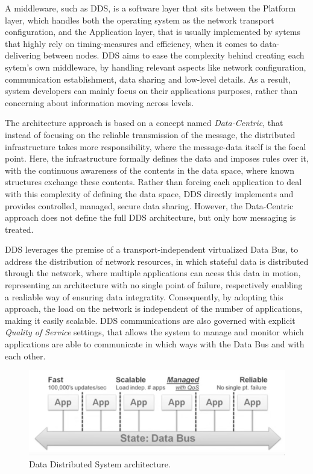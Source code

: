 A middleware, such as DDS, is a software layer that sits between the Platform layer, which handles both the operating system as the network transport configuration, and the Application layer, that is usually implemented by sytems that highly rely on timing-measures and efficiency, when it comes to data-delivering between nodes. DDS aims to ease the complexity behind creating each sytem's own middleware, by handling relevant aspects like network configuration, communication establishment, data sharing and low-level details. As a result, system developers can mainly focus on their applications purposes, rather than concerning about information moving across levels. 

The architecture approach is based on a concept named \textit{Data-Centric}, that instead of focusing on the reliable transmission of the message, the distributed infrastructure takes more responsibility, where the message-data itself is the focal point. Here, the infrastructure formally defines the data and imposes rules over it, with the continuous awareness of the contents in the data space, where known structures exchange these contents. Rather than forcing each application to deal with this complexity of defining the data space, DDS directly implements and provides controlled, managed, secure data sharing. However, the Data-Centric approach does not define the full DDS architecture, but only how messaging is treated.

DDS leverages the premise of a transport-independent virtualized Data Bus, to address the distribution of network resources, in which stateful data is distributed through the network, where multiple applications can acess this data in motion, representing an architecture with no single point of failure, respectively enabling a realiable way of ensuring data integratity. Consequently, by adopting this approach, the load on the network is independent of the number of applications, making it easily scalable. DDS communications are also governed with explicit \textit{Quality of Service} settings, that allows the system to manage and monitor which applications are able to communicate in which ways with the Data Bus and with each other. 

\begin{figure}[H]
    \centering
    \includegraphics[width=0.6\linewidth]{images/dds-architecture.png}
    \caption{Data Distributed System architecture.}
    \label{fig:dds-architecture}
\end{figure}

